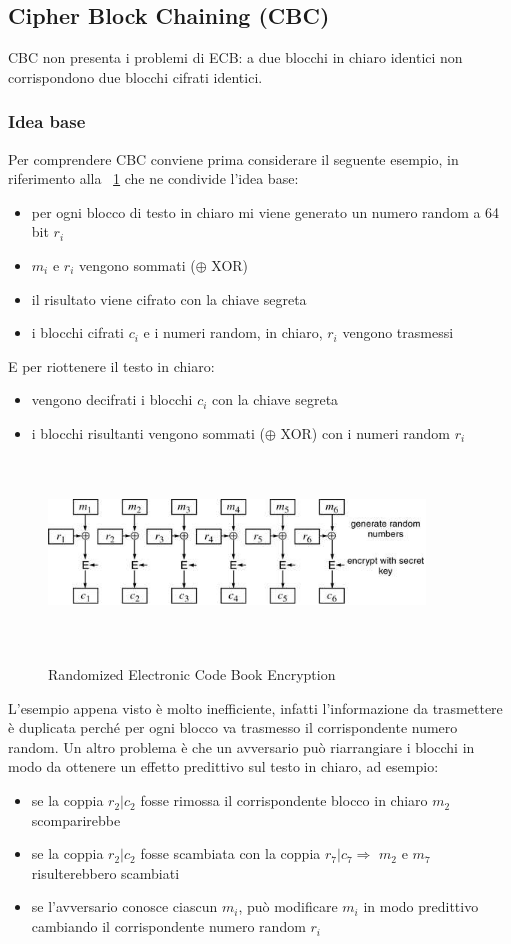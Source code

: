 \subsection{Cipher Block Chaining (CBC)}
CBC non presenta i problemi di ECB: a due blocchi in chiaro identici non corrispondono
due blocchi cifrati identici.
\subsubsection{Idea base}
Per comprendere CBC conviene prima considerare il seguente esempio, in riferimento alla \figurename ~\ref{fig:rand_ele_cb_enc} che ne condivide l’idea base:
\begin{itemize}
\item per ogni blocco di testo in chiaro mi viene generato un numero random a 64 bit $r_{i}$
\item $m_{i}$ e $r_{i}$ vengono sommati ($\oplus$ XOR)
\item il risultato viene cifrato con la chiave segreta
\item i blocchi cifrati $c_{i}$ e i numeri random, in chiaro, $r_{i}$ vengono trasmessi
\end{itemize}
E per riottenere il testo in chiaro:
\begin{itemize}
\item vengono decifrati i blocchi $c_{i}$ con la chiave segreta 
\item i blocchi risultanti vengono sommati ($\oplus$ XOR) con i numeri random $r_{i}$
\end{itemize}
\begin{figure}
\centering%
	\subfigure%
	{\includegraphics[height=5cm, width=10cm, keepaspectratio]{Immagini/Capitolo3/rand_ele_cb_enc.png}}
	\caption{Randomized Electronic Code Book Encryption\label{fig:rand_ele_cb_enc}} 	
\end{figure}
L'esempio appena visto è molto inefficiente, infatti l'informazione da trasmettere è duplicata perché per ogni blocco va trasmesso il corrispondente numero random. \newline
Un altro problema è che un avversario può riarrangiare i blocchi in modo da ottenere un effetto predittivo sul testo in chiaro, ad esempio:
\begin{itemize}
\item se la coppia $r_{2}|c_{2}$ fosse rimossa il corrispondente blocco in chiaro $m_{2}$ scomparirebbe 
\item se la coppia $r_{2}|c_{2}$ fosse scambiata con la coppia $r_{7}|c_{7} \Rightarrow$ $m_{2}$ e $m_{7}$ risulterebbero scambiati
\item se l’avversario conosce ciascun  $m_{i}$, può modificare  $m_{i}$ in modo predittivo cambiando il corrispondente numero random $r_{i}$
\end{itemize}

